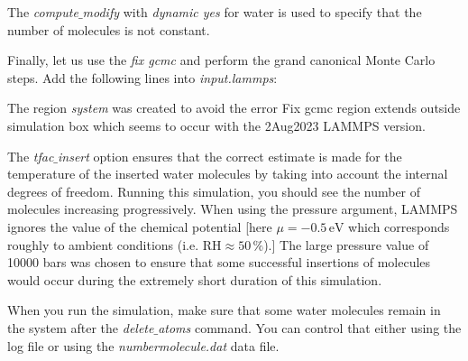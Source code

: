 \noindent The \textit{compute$\_$modify} with 
\textit{dynamic yes} for water is used to specify that the
number of molecules is not constant.

\vspace{0.25cm} \noindent Finally, let us use the \textit{fix gcmc} and perform the grand
canonical Monte Carlo steps. Add the following lines into \textit{input.lammps}:


\noindent \begin{tcolorbox}[colback=mylightblue!5!white,colframe=mylightblue!75!black,title=Dirty fix]

\vspace{0.25cm} \noindent The region \textit{system} was created to avoid the error Fix gcmc
region extends outside simulation box
which seems to occur with the 2Aug2023 LAMMPS version.
\end{tcolorbox}

\noindent The \textit{tfac$\_$insert} option ensures that the correct estimate is
made for the temperature of the inserted water molecules by
taking into account the internal degrees of freedom. Running
this simulation, you should see the number of molecules
increasing progressively. When using the pressure argument,
LAMMPS ignores the value of the chemical potential [here $\mu = -0.5\,$
which corresponds roughly to ambient conditions (i.e. $ \,\%$).]
The large pressure value of 10000 bars was chosen to ensure that 
some successful insertions of molecules would occur during the 
extremely short duration of this simulation.

\vspace{0.25cm} \noindent When you run the simulation, make sure that some water molecules 
remain in the system after the \textit{delete$\_$atoms} command. You can control 
that either using the log file or using the \textit{numbermolecule.dat} data file.

